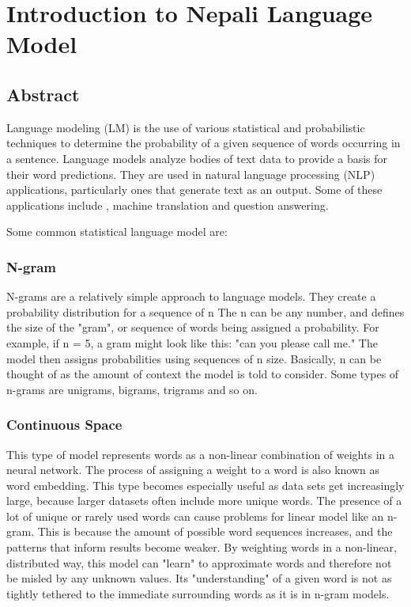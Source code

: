 \chapter{Introduction to Nepali Language Model}
\section{Abstract}
Language modeling (LM) is the use of various statistical and probabilistic techniques to determine the probability of a given sequence of words occurring in a sentence. Language models analyze bodies of text data to provide a basis for their word predictions. They are used in natural language processing (NLP) applications, particularly ones that generate text as an output. Some of these applications include , machine translation and question answering.

Some common statistical language model are:

\subsection{N-gram} 
N-grams are a relatively simple approach to language models. They create a probability distribution for a sequence of n The n can be any number, and defines the size of the "gram", or sequence of words being assigned a probability. For example, if n = 5, a gram might look like this: "can you please call me." The model then assigns probabilities using sequences of n size. Basically, n can be thought of as the amount of context the model is told to consider. Some types of n-grams are unigrams, bigrams, trigrams and so on.

\subsection{Continuous Space}
This type of model represents words as a non-linear combination of weights in a neural network. The process of assigning a weight to a word is also known as word embedding. This type becomes especially useful as data sets get increasingly large, because larger datasets often include more unique words. The presence of a lot of unique or rarely used words can cause problems for linear model like an n-gram. This is because the amount of possible word sequences increases, and the patterns that inform results become weaker. By weighting words in a non-linear, distributed way, this model can "learn" to approximate words and therefore not be misled by any unknown values. Its "understanding" of a given word is not as tightly tethered to the immediate surrounding words as it is in n-gram models.

